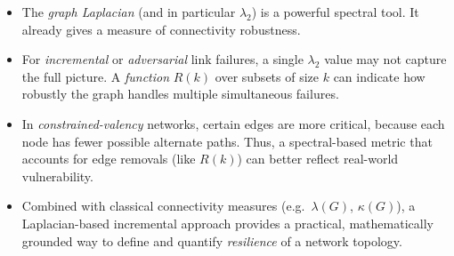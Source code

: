 \documentclass[../../../OAE-SPEC-MAIN.tex]{subfiles}
\begin{document}
\begin{itemize}
\item The \emph{graph Laplacian} (and in particular $\lambda_2$) is a powerful spectral tool. It already gives a measure of connectivity robustness.
\item For \emph{incremental} or \emph{adversarial} link failures, a single $\lambda_2$ value may not capture the full picture. A \emph{function} $R(k)$ over subsets of size $k$ can indicate how robustly the graph handles multiple simultaneous failures.
\item In \emph{constrained-valency} networks, certain edges are more critical, because each node has fewer possible alternate paths. Thus, a spectral-based metric that accounts for edge removals (like $R(k)$) can better reflect real-world vulnerability.
\item Combined with classical connectivity measures (e.g.\ $\lambda(G)$, $\kappa(G)$), a Laplacian-based incremental approach provides a practical, mathematically grounded way to define and quantify \emph{resilience} of a network topology.
\end{itemize}
\end{document}
